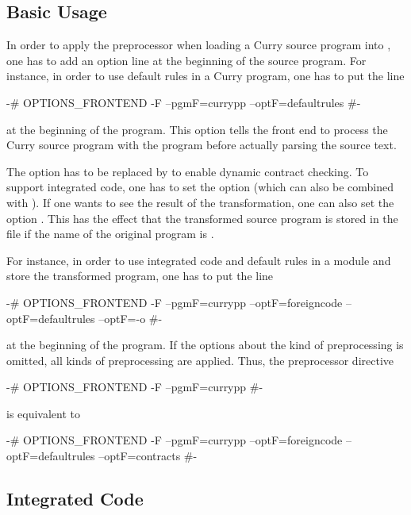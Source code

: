 \subsection{Basic Usage}

In order to apply the preprocessor when loading a Curry source
program into \CYS, one has to add an option line
at the beginning of the source program.
For instance, in order to use default rules in a Curry program,
one has to put the line
\begin{curry}
{-# OPTIONS_FRONTEND -F --pgmF=currypp --optF=defaultrules #-}
\end{curry}
at the beginning of the program.
This option tells the \CYS front end to process the Curry source program
with the program  before actually parsing the source text.

The option  has to be replaced by
 to enable dynamic contract checking.
To support integrated code, one has to set the option
 (which can also be combined with ).
If one wants to see the result of the transformation, one can
also set the option . This has the effect that the
transformed source program is stored in the file
 if the name of the original program
is .

For instance, in order to use integrated code and default rules
in a module and store the transformed program,
one has to put the line
\begin{curry}
{-# OPTIONS_FRONTEND -F --pgmF=currypp --optF=foreigncode --optF=defaultrules --optF=-o #-}
\end{curry}
at the beginning of the program.
%
If the options about the kind of preprocessing is omitted,
all kinds of preprocessing
are applied. Thus, the preprocessor directive
\begin{curry}
{-# OPTIONS_FRONTEND -F --pgmF=currypp #-}
\end{curry}
is equivalent to
\begin{curry}
{-# OPTIONS_FRONTEND -F --pgmF=currypp --optF=foreigncode --optF=defaultrules --optF=contracts #-}
\end{curry}


\subsection{Integrated Code}

